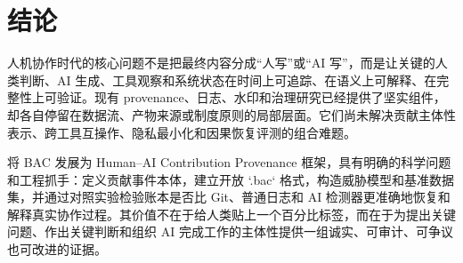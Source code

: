 \documentclass[UTF8,a4paper,12pt]{ctexart}
\begin{document}
\section{结论}
人机协作时代的核心问题不是把最终内容分成“人写”或“AI 写”，而是让关键的人类判断、AI 生成、工具观察和系统状态在时间上可追踪、在语义上可解释、在完整性上可验证。现有 provenance、日志、水印和治理研究已经提供了坚实组件，却各自停留在数据流、产物来源或制度原则的局部层面。它们尚未解决贡献主体性表示、跨工具互操作、隐私最小化和因果恢复评测的组合难题。

将 BAC 发展为 Human--AI Contribution Provenance 框架，具有明确的科学问题和工程抓手：定义贡献事件本体，建立开放 `.bac` 格式，构造威胁模型和基准数据集，并通过对照实验检验账本是否比 Git、普通日志和 AI 检测器更准确地恢复和解释真实协作过程。其价值不在于给人类贴上一个百分比标签，而在于为提出关键问题、作出关键判断和组织 AI 完成工作的主体性提供一组诚实、可审计、可争议也可改进的证据。



\end{document}
